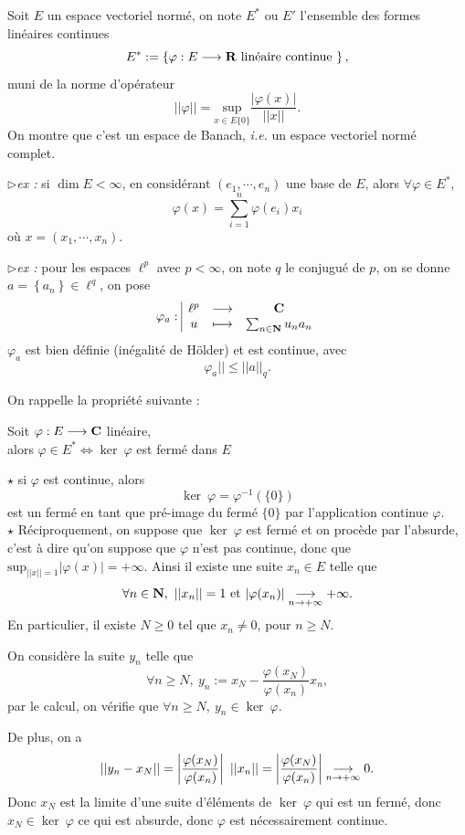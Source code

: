 \documentclass[a4paper,11pt, twoside]{article}
\begin{document}
Soit $E$ un espace vectoriel normé, on note $E^*$ ou $E'$ l'ensemble des formes linéaires continues
$$E^*:=\left\{\varphi:E\longrightarrow \mathbf R\text{ linéaire continue }\right\},$$ 
muni de la norme d'opérateur 
$$||\varphi||=\underset{x\in E\{0\}}{\mathrm{sup}}\frac{|\varphi(x)|}{||x||}.$$
On montre que c'est un espace de Banach, \emph{i.e.} un espace vectoriel normé complet.

$\triangleright$\emph{ex : }si $\dim E<\infty$, en considérant $(e_1,\cdots, e_n)$ une base de $E$, alors $\forall \varphi\in E^*$,
$$\varphi(x)=\sum_{i=1}^n\varphi(e_i)x_i$$
où $x=(x_1,\cdots,x_n)$.

$\triangleright$\emph{ex : }pour les espaces $\ell^p$ avec $p<\infty$, on note $q$ le conjugué de $p$, on se donne $a=\left\{a_n\right\}\in\ell^q$, on pose 
$$\varphi_a:\begin{array}{|ccc}
  \ell^p&\longrightarrow&\mathbf C\\
  u&\longmapsto&\sum_{n\in\mathbf N}u_na_n 
\end{array}$$
$\varphi_a$ est bien définie (inégalité de Hölder) et est continue, avec 
$$\varphi_a||\leqslant ||a||_q.$$

On rappelle la propriété suivante : 


\begin{prop}
  Soit $\varphi:E\longrightarrow \mathbf C$ linéaire,\\

  alors $\varphi\in E^*\Leftrightarrow\ker\ \varphi$ est fermé dans $E$
\end{prop}


\begin{Proof}
  $\star$ si $\varphi$ est continue, alors 
  $$\ker\ \varphi=\varphi^{-1}(\{0\})$$
  est un fermé en tant que pré-image du fermé $\{0\}$ par l'application continue $\varphi$.\\

  $\star$ Réciproquement, on suppose que $\ker\ \varphi$ est fermé et on procède par l'absurde, c'est à dire qu'on suppose que $\varphi$ n'est pas continue, donc que $\mathrm{sup}_{||x||=1}|\varphi(x)|=+\infty$. Ainsi il existe une  suite $x_n\in E$ telle que 
  $$\forall n\in \mathbf N,\ ||x_n||=1\text{ et }|\varphi(x_n)|\underset{n\to+\infty}{\longrightarrow} +\infty.$$
  En particulier, il existe $N\geqslant 0$ tel que $x_n\neq 0$, pour $n\geqslant N$.

  On considère la suite $y_n$ telle que 
  $$\forall n\geqslant N,\ y_n:=x_N-\frac{\varphi(x_N)}{\varphi(x_n)}x_n,$$
  par le calcul, on vérifie que $\forall n\geqslant N,\ y_n\in\ker\ \varphi$.

  De plus, on a 
  $$||y_n-x_N||=\left|\frac{\varphi(x_N)}{\varphi(x_n)}\right|\ ||x_n||=\left|\frac{\varphi(x_N)}{\varphi(x_n)}\right|\tend 0.$$
  Donc $x_N$ est la limite d'une suite d'éléments de $\ker\ \varphi$ qui est un fermé, donc $x_N\in\ker\ \varphi$ ce qui est absurde, donc $\varphi$ est nécessairement continue.
\end{Proof}
\end{document}
